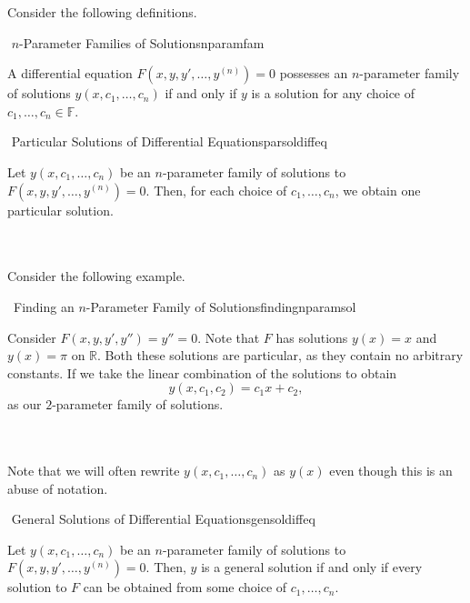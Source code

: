         Consider the following definitions.
        \begin{definition}{\Stop\,\,\(n\)-Parameter Families of Solutions}{nparamfam}

            A differential equation \(F(x,y,y',\ldots,y^{(n)})=0\) possesses an \(n\)-parameter family of solutions \(y(x,c_1,\ldots,c_n)\) if and only if \(y\) is a solution for any choice of \(c_1,\ldots,c_n\in\mathbb{F}\).
            
        \end{definition}
        \begin{definition}{\Stop\,\,Particular Solutions of Differential Equations}{parsoldiffeq}

            Let \(y(x,c_1,\ldots,c_n)\) be an \(n\)-parameter family of solutions to \(F(x,y,y',\ldots,y^{(n)})=0\). Then, for each choice of \(c_1,\ldots,c_n\), we obtain one particular solution.
            
        \end{definition}
        \vphantom
        \\
        \\
        Consider the following example.
        \begin{example}{\Difficulty\,\Difficulty\,\,Finding an \(n\)-Parameter Family of Solutions}{findingnparamsol}

            Consider \(F(x,y,y',y'')=y''=0\). Note that \(F\) has solutions \(y(x)=x\) and \(y(x)=\pi\) on \(\mathbb{R}\). Both these solutions are particular, as they contain no arbitrary constants. If we take the linear combination of the solutions to obtain
            \begin{equation*}
                y(x,c_1,c_2)=c_1x+c_2,
            \end{equation*}
            as our \(2\)-parameter family of solutions.
            
        \end{example}
        \vphantom
        \\
        \\
        Note that we will often rewrite \(y(x,c_1,\ldots,c_n)\) as \(y(x)\) even though this is an abuse of notation.
        \begin{definition}{\Stop\,\,General Solutions of Differential Equations}{gensoldiffeq}

            Let \(y(x,c_1,\ldots,c_n)\) be an \(n\)-parameter family of solutions to \(F(x,y,y',\ldots,y^{(n)})=0\). Then, \(y\) is a general solution if and only if every solution to \(F\) can be obtained from some choice of \(c_1,\ldots,c_n\).
            
        \end{definition}
